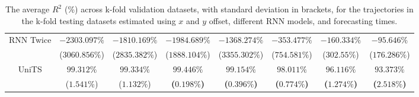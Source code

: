 \begin{table}[!ht]
{\begin{tabular}{|c|c|c|c|c|c|c|c|}
			\multirow{2}{*}{RNN Twice} & $-2303.097\%$ & $-1810.169\%$ & $-1984.689\%$ & $-1368.274\%$ & $-353.477\%$ & $-160.334\%$ & $-95.646\%$ \\
			 & ($3060.856\%$) & ($2835.382\%$) & ($1888.104\%$) & ($3355.302\%$) & ($754.581\%$) & ($302.55\%$) & ($176.286\%$) \\ \hline
			\multirow{2}{*}{UniTS} & $99.312\%$ & $99.334\%$ & $\mathbf{99.446\%}$ & $\mathbf{99.154\%}$ & $\mathbf{98.011\%}$ & $\mathbf{96.116\%}$ & $\mathbf{93.373\%}$ \\
			 & ($1.541\%$) & ($1.132\%$) & \textbf{(}$\mathbf{0.198\%}$\textbf{)} & \textbf{(}$\mathbf{0.396\%}$\textbf{)} & \textbf{(}$\mathbf{0.774\%}$\textbf{)} & \textbf{(}$\mathbf{1.274\%}$\textbf{)} & \textbf{(}$\mathbf{2.518\%}$\textbf{)} \\ \hline
		\end{tabular}
	}
	\caption{The average $R^{2}$ (\%) across k-fold validation datasets, with standard deviation in brackets, for the trajectories in the k-fold testing datasets estimated using $x$ and $y$ offset, different RNN models, and forecasting times.}
	\label{tab:all_no_abs_R2}
\end{table}

